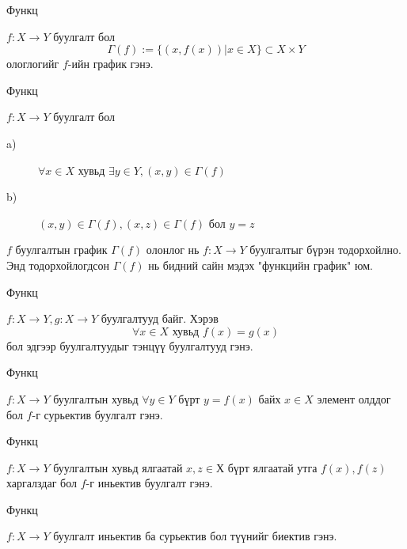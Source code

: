 \begin{frame}[allowframebreaks]{Функц}
\begin{definition}[График]
 $f:X\to Y$ буулгалт бол 
 $$\Gamma(f):=\{(x,f(x))|x\in X\}\subset X\times Y$$ ологлогийг $f$-ийн график гэнэ.  
\end{definition}
\end{frame}

\begin{frame}[allowframebreaks]{Функц}
\begin{theorem}\label{fun:grap}
 $f:X\to Y$ буулгалт бол 
\begin{description}
\item[a)] $\forall x\in X$ хувьд $\exists y\in Y , (x,y)\in \Gamma(f)$
\item[b)] $(x,y)\in \Gamma(f) , (x,z)\in \Gamma(f)$ бол $y=z$
\end{description}
\end{theorem}
 $f$ буулгалтын график $ \Gamma(f)$ олонлог нь  $f:X\to Y$ буулгалтыг бүрэн тодорхойлно. Энд тодорхойлогдсон $\Gamma(f)$ нь бидний сайн мэдэх "функцийн график" юм. 
\end{frame}

\begin{frame}[allowframebreaks]{Функц}
\begin{definition}
$f:X\to Y , g:X\to Y$ буулгалтууд байг. Хэрэв $$\forall x\in X \text{ хувьд } f(x)=g(x)$$
 бол эдгээр буулгалтуудыг тэнцүү буулгалтууд гэнэ. 
\end{definition}
\end{frame}

\begin{frame}[allowframebreaks]{Функц}
\begin{definition}[Сурьектив]
$f:X\to Y$ буулгалтын хувьд $\forall y\in Y$ бүрт $y=f(x)$ байх $x\in X$ элемент олддог бол $f$-г сурьектив буулгалт гэнэ. 
\end{definition}
\end{frame}

\begin{frame}[allowframebreaks]{Функц}
\begin{definition}[Иньектив]
$f:X\to Y$ буулгалтын хувьд ялгаатай $x , z \in Х$ бүрт ялгаатай утга $f(x) , f(z)$ харгалздаг бол $f$-г иньектив буулгалт гэнэ. 
\end{definition}
\end{frame}

\begin{frame}[allowframebreaks]{Функц}
\begin{definition}[Биектив]
$f:X\to Y$ буулгалт иньектив ба сурьектив бол түүнийг биектив гэнэ. 
\end{definition}
\end{frame}

